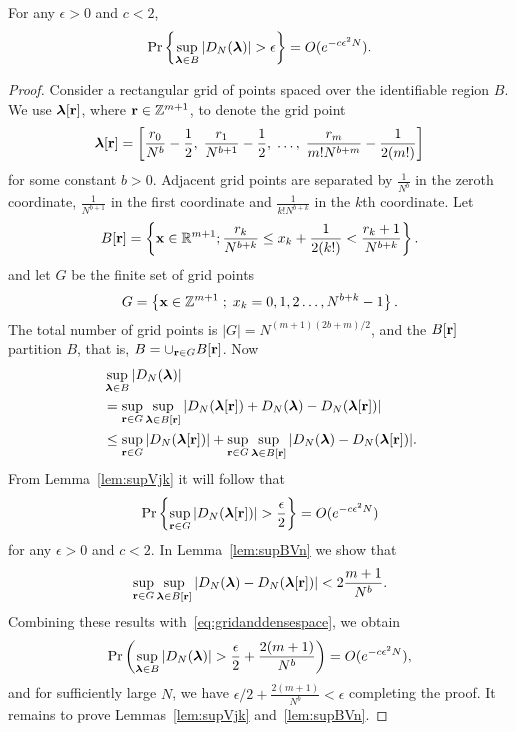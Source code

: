 \documentclass[journal]{IEEEtran}
\begin{document}
\begin{lemma} \label{lem:vn} 
For any $\epsilon > 0$ and $c < 2$,
\[
\operatorname{Pr} \left\{ \sup_{\boldsymbol{\lambda} \in B}\left\vert  D_N(\boldsymbol{\lambda})  \right\vert > \epsilon \right\} = O(e^{-c \epsilon^2 N}).
\]
 \end{lemma}
\begin{proof}
Consider a rectangular grid of points spaced over the identifiable region $B$.  We use $\boldsymbol{\lambda}[\mathbf{r}]$, where $\mathbf{r} \in {\mathbb Z}^{m+1}$, to denote the grid point 
\[ 
 \boldsymbol{\lambda}[\mathbf{r}] = \left[  \frac{r_0}{N^{b}} - \frac{1}{2}, \; \frac{r_1}{N^{b+1}} - \frac{1}{2}, \; \dots, \; \frac{r_m}{m!N^{b+m}} - \frac{1}{2(m!) }\right]
\]
 for some constant $b>0$.  Adjacent grid points are separated by $\tfrac{1}{N^b}$ in the zeroth coordinate, $\tfrac{1}{N^{b+1}}$ in the first coordinate and $\tfrac{1}{k!N^{b+k}}$ in the $k$th coordinate. Let
 \[
 B[\mathbf{r}]=\left\{  \mathbf{x}\in{\mathbb R}^{m+1}  ; \frac{r_k}{N^{b+k}}\leq x_k + \frac{1}{2(k!)} < \frac{r_k + 1}{N^{b+k}} \right\}  .
 \]
and let $G$ be the finite set of grid points
\[
G = \left\{ \mathbf{x} \in {\mathbb Z}^{m+1} \; ; \; x_k = 0,1,2\dots,N^{b+k}-1  \right\}.
\]
The total number of grid points is $|G| = N^{(m+1)(2b + m)/2}$, and the $B[\mathbf{r}]$ partition $B$, that is, $B = \cup_{\mathbf{r} \in G}B[\mathbf{r}]$.  Now 
\begin{align}
 &\sup_{\lambdabf \in B}\sabs{ D_N(\lambdabf) }  \nonumber \\
&= \sup_{\rbf \in G}\sup_{ \lambdabf \in B[\rbf]}\sabs{ D_N(\lambdabf[\rbf]) + D_N(\lambdabf) - D_N(\lambdabf[\rbf])  } \nonumber \\
 &\leq \sup_{\rbf \in G}\sabs{ D_N(\lambdabf[\rbf])} + \sup_{\rbf \in G}\sup_{\lambdabf\in B[\rbf]}\sabs{ D_N(\lambdabf) - D_N(\lambdabf[\rbf])  }. \label{eq:gridanddensespace}
 \end{align}
From Lemma~\ref{lem:supVjk} it will follow that 
\[
\operatorname{Pr}\left\{   \sup_{\mathbf{r} \in G }\left\vert  D_N(\boldsymbol{\lambda}[\mathbf{r}])   \right\vert > \frac{\epsilon}{2} \right\} = O(e^{-c \epsilon^2 N})
\]
for any $\epsilon > 0$ and $c < 2$.  In Lemma~\ref{lem:supBVn} we show that
\[
\sup_{\mathbf{r} \in G}\sup_{\boldsymbol{\lambda}\in B[\mathbf{r}]}\left\vert  D_N(\boldsymbol{\lambda}) - D_N(\boldsymbol{\lambda}[\mathbf{r}]) \right\vert < 2\frac{m+1}{N^b}.
\]
Combining these results with~\eqref{eq:gridanddensespace}, we obtain
\[
\operatorname{Pr}\left(\sup_{\boldsymbol{\lambda} \in B }\vert  D_N(\boldsymbol{\lambda}) \vert > \frac{\epsilon}{2} +  \frac{2(m+1)}{N^b} \right) = O(e^{-c \epsilon^2 N}),
\]
and for sufficiently large $N$, we have $\epsilon/2 + \frac{2(m+1)}{N^b} < \epsilon$ completing the proof.  It remains to prove Lemmas~\ref{lem:supVjk} and~\ref{lem:supBVn}.
\end{proof}
\end{document}
